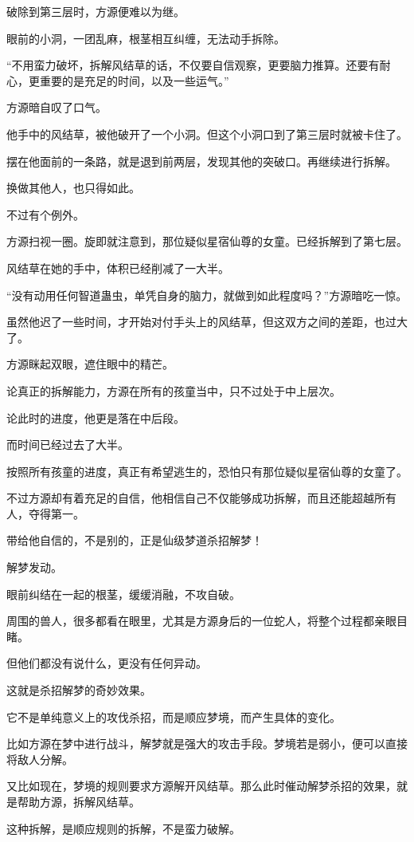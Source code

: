 \begin{this_body}
破除到第三层时，方源便难以为继。

眼前的小洞，一团乱麻，根茎相互纠缠，无法动手拆除。

“不用蛮力破坏，拆解风结草的话，不仅要自信观察，更要脑力推算。还要有耐心，更重要的是充足的时间，以及一些运气。”

方源暗自叹了口气。

他手中的风结草，被他破开了一个小洞。但这个小洞口到了第三层时就被卡住了。

摆在他面前的一条路，就是退到前两层，发现其他的突破口。再继续进行拆解。

换做其他人，也只得如此。

不过有个例外。

方源扫视一圈。旋即就注意到，那位疑似星宿仙尊的女童。已经拆解到了第七层。

风结草在她的手中，体积已经削减了一大半。

“没有动用任何智道蛊虫，单凭自身的脑力，就做到如此程度吗？”方源暗吃一惊。

虽然他迟了一些时间，才开始对付手头上的风结草，但这双方之间的差距，也过大了。

方源眯起双眼，遮住眼中的精芒。

论真正的拆解能力，方源在所有的孩童当中，只不过处于中上层次。

论此时的进度，他更是落在中后段。

而时间已经过去了大半。

按照所有孩童的进度，真正有希望逃生的，恐怕只有那位疑似星宿仙尊的女童了。

不过方源却有着充足的自信，他相信自己不仅能够成功拆解，而且还能超越所有人，夺得第一。

带给他自信的，不是别的，正是仙级梦道杀招解梦！

解梦发动。

眼前纠结在一起的根茎，缓缓消融，不攻自破。

周围的兽人，很多都看在眼里，尤其是方源身后的一位蛇人，将整个过程都亲眼目睹。

但他们都没有说什么，更没有任何异动。

这就是杀招解梦的奇妙效果。

它不是单纯意义上的攻伐杀招，而是顺应梦境，而产生具体的变化。

比如方源在梦中进行战斗，解梦就是强大的攻击手段。梦境若是弱小，便可以直接将敌人分解。

又比如现在，梦境的规则要求方源解开风结草。那么此时催动解梦杀招的效果，就是帮助方源，拆解风结草。

这种拆解，是顺应规则的拆解，不是蛮力破解。


\end{this_body}
